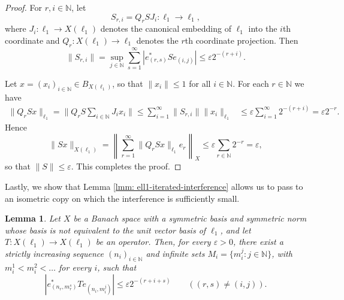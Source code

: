 \documentclass[11pt]{amsart}
\theoremstyle{plain}
\newtheorem{lemma}[theorem]{Lemma}
\theoremstyle{definition}
\numberwithin{equation}{section}
\newcommand{\norm}[1]{\lVert #1 \rVert}
\newcommand{\N}{\mathbb{N}}
\renewcommand{\leq}{\leqslant}
\begin{document}
\begin{proof}
    For $r,i \in \N$, let
    \begin{equation*}
        S_{r,i}
        =
        Q_r S J_i \colon \ell_1 \to \ell_1,
    \end{equation*}
    where $J_i \colon \ell_1 \to X(\ell_1)$ denotes the canonical embedding of $\ell_1$ into the $i$th coordinate and $Q_r \colon X(\ell_1) \to \ell_1$ denotes the $r$th coordinate projection. Then
    \begin{equation*}
        \norm{S_{r,i}}
        =
        \sup_{j \in \N} \sum_{s=1}^\infty |e^*_{(r,s)} S e_{(i,j)}|
        \leq
        \varepsilon 2^{-(r+i)}.
    \end{equation*}

    Let $x = (x_i)_{i \in \N} \in B_{X(\ell_1)}$, so that $\norm{x_i} \leq 1$ for all $i \in \N$. For each $r \in \N$ we have
    \begin{align*}
        \norm{Q_rSx}_{\ell_1} = \norm{Q_r S \sum_{i \in \N} J_i x_i } \leq
        \sum_{i=1}^\infty \norm{S_{r,i}} \norm{x_i}_{\ell_1}
        &\leq
        \varepsilon \sum_{i=1}^\infty 2^{-(r+i)} = \varepsilon 2^{-r}.
    \end{align*}
    Hence
    \begin{equation*}
        \norm{Sx}_{X(\ell_1)} =
        \left\|
            \sum_{r=1}^\infty \norm{Q_r S x}_{\ell_1} e_r
        \right\|_X \leq
        \varepsilon \sum_{r \in \N} 2^{-r} = \varepsilon ,
    \end{equation*}
    so that $\norm{S} \leq \varepsilon$. This completes the proof.
\end{proof}

Lastly, we show that Lemma \ref{lmm: ell1-iterated-interference} allows us to pass to an isometric copy on which the interference is sufficiently small.


\begin{lemma}\label{lmm: ell1-iterated-true-diagonal}
    Let $X$ be a Banach space with a symmetric basis and symmetric norm whose basis is not equivalent to the unit vector basis of $\ell_1$, and let $T \colon X(\ell_1) \to X(\ell_1)$ be an operator. Then, for every $\varepsilon > 0$, there exist a strictly increasing sequence $(n_i)_{i \in \N}$ and infinite sets $M_i=\{m_i^j : j \in \N\}$, with $m_i^1<m_i^2<\ldots$ for every $i$, such that
    \begin{equation*}
        |e^*_{(n_r,m_r^s)} T e_{(n_i,m_i^j)}|
        \leq
        \varepsilon 2^{-(r+i+s)}
        \qquad ((r,s) \neq (i,j)).
    \end{equation*}
\end{lemma}
\end{document}
